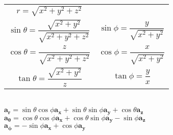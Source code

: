 \documentclass[12pt]{exam}
\begin{document}
\begin{multicols}{2}
\begin{flushleft}
		\begin{tabular}{c c}
			$r=\sqrt{x^2+y^2+z^2}$ & \\ 		\vspace{0.1in}
			$\sin\theta=\dfrac{\sqrt{x^2+y^2}}{\sqrt{x^2+y^2+z^2}}$ & $\sin\phi=\dfrac{y}{\sqrt{x^2+y^2}}$\\ 		\vspace{0.1in}
			$\cos\theta=\dfrac{z}{\sqrt{x^2+y^2+z^2}}$ & $\cos\phi=\dfrac{x}{\sqrt{x^2+y^2}}$ \\ 		\vspace{0.1in}
			$\tan\theta=\dfrac{\sqrt{x^2+y^2}}{z}$ & $\tan\phi=\dfrac{y}{x}$
		\end{tabular} \\ 		\vspace{0.1in}
		$\mathbf{a_r} = \sin\theta\cos\phi\mathbf{a_x}+\sin\theta\sin\phi\mathbf{a_y}+\cos\theta\mathbf{a_z}$ \\ 		\vspace{0.1in}
		$\mathbf{a_\theta} = \cos\theta\cos\phi\mathbf{a_x}+\cos\theta\sin\phi\mathbf{a_y}-\sin\phi\mathbf{a_z}$ \\ 		\vspace{0.1in}
		$\mathbf{a_\phi} = -\sin\phi\mathbf{a_x}+\cos\phi\mathbf{a_y}$ \\
		\hfill \break 		\vspace{0.1in}

\end{flushleft}
\end{multicols}
\end{document}

